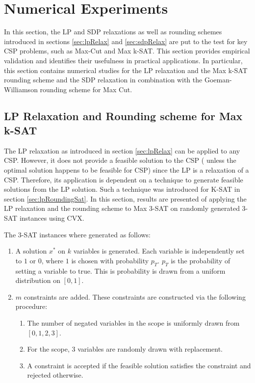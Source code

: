 \section{Numerical Experiments}
In this section, the LP and SDP relaxations as well as rounding schemes introduced in sections \ref{sec:lpRelax} and \ref{sec:sdpRelax} are put to the test for key CSP problems, such as Max-Cut and Max k-SAT. This section provides empirical validation and identifies their usefulness in practical applications. In particular, this section contains numerical studies for the LP relaxation and the Max k-SAT rounding scheme and the SDP relaxation in combination with the Goeman-Williamson rounding scheme for Max Cut. 

\subsection{LP Relaxation and Rounding scheme for Max k-SAT}
The LP relaxation as introduced in section \ref{sec:lpRelax} can be applied to any CSP. However, it does not provide a feasible solution to the CSP ( unless the optimal solution happens to be feasible for CSP) since the LP is a relaxation of a CSP. Therefore, its application is dependent on a technique to generate feasible solutions from the LP solution. Such a technique was introduced for K-SAT in section \ref{sec:lpRoundingSat}. In this section, results are presented of applying the LP relaxation and the rounding scheme to Max 3-SAT on randomly generated 3-SAT instances using CVX.

The 3-SAT instances where generated as follows:
\begin{enumerate}
	\item A solution $x^*$ on $k$ variables is generated. Each variable is independently set to $1$ or $0$, where $1$ is chosen with probability $p_T$. $p_T$ is the probability of setting a variable to true. This is probability is drawn from a uniform distribution on $[0,1]$. 
	\item $m$ constraints are added. These constraints are constructed via the following procedure:
	\begin{enumerate}
		\item The number of negated variables in the scope is uniformly drawn from $[0,1,2,3]$.
		\item For the scope, 3 variables are randomly drawn with replacement.
		\item A constraint is accepted if the feasible solution satisfies the constraint and rejected otherwise.
	\end{enumerate}
\end{enumerate}


